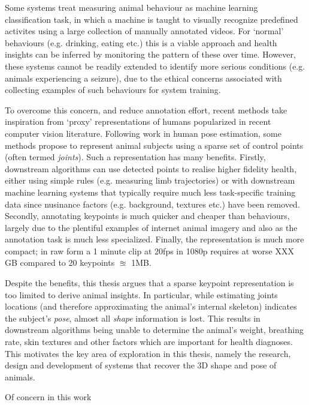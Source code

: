 Some systems treat measuring animal behaviour as machine learning classification task, in which a machine is taught to visually recognize predefined activites using a large collection of manually annotated videos. For `normal' behaviours (e.g. drinking, eating etc.) this is a viable approach and health insights can be inferred by monitoring the pattern of these over time. However, these systems cannot be readily extended to identify more serious conditions (e.g. animals experiencing a seizure), due to the ethical concerns associated with collecting examples of such behaviours for system training. 

To overcome this concern, and reduce annotation effort, recent methods take inspiration from `proxy' representations of humans popularized in recent computer vision literature. Following work in human pose estimation, some methods propose to represent animal subjects using a sparse set of control 
points (often termed \emph{joints}). Such a representation has many benefits. Firstly, downstream algorithms can use detected points to realise higher fidelity health, either using simple rules (e.g. measuring limb trajectories) or with downstream machine learning systems that typically require much less task-specific training data since nusinance factors (e.g. background, textures etc.) have been removed. Secondly, annotating keypoints is much quicker and cheaper than behaviours, largely due to the plentiful examples of internet animal imagery and also as the annotation task is much less specialized. Finally, the representation is much more compact; in raw form a 1 minute clip at 20fps in 1080p requires at worse XXX GB compared to 20 keypoints $\approxeq$ 1MB. 

Despite the benefits, this thesis argues that a sparse keypoint representation is too limited to derive animal insights. In particular, while estimating joints locations (and therefore approximating the animal's internal skeleton) indicates the subject's \emph{pose}, almost all \emph{shape} information is lost. This results in downstream algorithms being unable to determine the animal's weight, breathing rate, skin textures and other factors which are important for health diagnoses. This motivates the key area of exploration in this thesis, namely the research, design and development of systems that recover the 3D shape and pose of animals.

Of concern in this work


